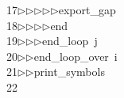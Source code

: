 \begin{tabbing}
17\>$\triangleright$\>$\triangleright$\>$\triangleright$\>$\triangleright$\>$\triangleright$\>export\_gap\ \\[0pt]
18\>$\triangleright$\>$\triangleright$\>$\triangleright$\>$\triangleright$\>end\ \\[0pt]
19\>$\triangleright$\>$\triangleright$\>$\triangleright$\>end\_loop\ j\ \\[0pt]
20\>$\triangleright$\>$\triangleright$\>end\_loop\_over\ i\ \\[0pt]
21\>$\triangleright$\>$\triangleright$\>print\_symbols\\[0pt]
22\>\end{tabbing}
